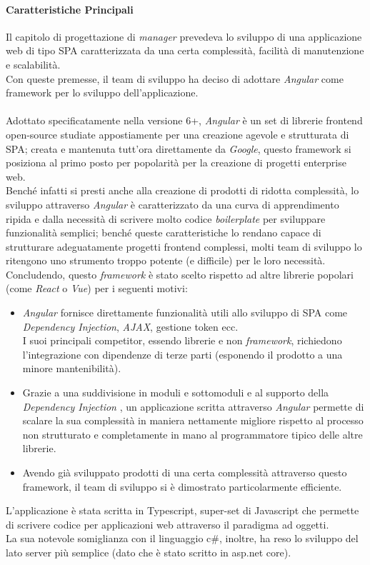 \documentclass[12pt]{article}
\begin{document}
\paragraph{Caratteristiche Principali}
Il capitolo di progettazione di \textit{manager} prevedeva lo sviluppo di una applicazione web di tipo SPA caratterizzata da una certa complessità, facilità di manutenzione e scalabilità.\\
Con queste premesse, il team di sviluppo ha deciso di adottare \textit{Angular} come framework per lo sviluppo dell'applicazione.\\\\
Adottato specificatamente nella versione 6+, \textit{Angular} è un set di librerie frontend open-source studiate appostiamente per una creazione agevole e strutturata di SPA; creata e mantenuta tutt'ora direttamente da \textit{Google}, questo framework si posiziona al primo posto per popolarità per la creazione di progetti enterprise web.\\
Benché infatti si presti anche alla creazione di prodotti di ridotta complessità, lo sviluppo attraverso \textit{Angular} è caratterizzato da una curva di apprendimento ripida e dalla necessità di scrivere molto codice \textit{boilerplate} per sviluppare funzionalità semplici; benché queste caratteristiche lo rendano capace di strutturare adeguatamente progetti frontend complessi, molti team di sviluppo lo ritengono uno strumento troppo potente (e difficile) per le loro necessità.\\
Concludendo, questo \textit{framework} è stato scelto rispetto ad altre librerie popolari (come \textit{React} o \textit{Vue}) per i seguenti motivi:
\begin{itemize}
\item \textit{Angular} fornisce direttamente funzionalità utili allo sviluppo di SPA come \textit{Dependency Injection}, \textit{AJAX}, gestione token ecc.\\
I suoi principali competitor, essendo librerie e non \textit{framework}, richiedono l'integrazione con dipendenze di terze parti (esponendo il prodotto a una minore mantenibilità).
\item Grazie a una suddivisione in moduli e sottomoduli e al supporto della \textit{Dependency Injection
}, un applicazione scritta attraverso \textit{Angular} permette di scalare la sua complessità in maniera nettamente migliore rispetto al processo non strutturato e completamente in mano al programmatore tipico delle altre librerie.
\item Avendo già sviluppato prodotti di una certa complessità attraverso questo framework, il team di sviluppo si è dimostrato particolarmente efficiente.
\end{itemize}
L'applicazione è stata scritta in Typescript, super-set di Javascript che permette di scrivere codice per applicazioni web attraverso il paradigma ad oggetti.\\
La sua notevole somiglianza con il linguaggio c\#, inoltre, ha reso lo sviluppo del lato server più semplice (dato che è stato scritto in asp.net core).
\end{document}
